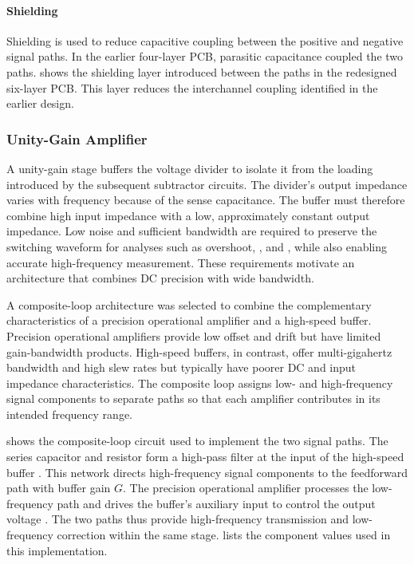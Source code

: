 \paragraph*{Shielding}
Shielding is used to reduce capacitive coupling between the positive and negative signal paths.
In the earlier four-layer PCB, parasitic capacitance  coupled the two paths.
 shows the shielding layer introduced between the paths in the redesigned six-layer PCB.
This layer reduces the interchannel coupling identified in the earlier design.











\FloatBarrier

\subsubsection*{Unity-Gain Amplifier}
A unity-gain stage buffers the voltage divider to isolate it from the loading introduced by the subsequent subtractor circuits.
The divider's output impedance varies with frequency because of the sense capacitance.
The buffer must therefore combine high input impedance with a low, approximately constant output impedance.
Low noise and sufficient bandwidth are required to preserve the switching waveform for analyses such as overshoot, , and , while also enabling accurate high-frequency measurement.
These requirements motivate an architecture that combines DC precision with wide bandwidth.

A composite-loop architecture was selected to combine the complementary characteristics of a precision operational amplifier and a high-speed buffer.
Precision operational amplifiers provide low offset and drift but have limited gain-bandwidth products.
High-speed buffers, in contrast, offer multi-gigahertz bandwidth and high slew rates but typically have poorer DC and input impedance characteristics.
The composite loop assigns low- and high-frequency signal components to separate paths so that each amplifier contributes in its intended frequency range.

 shows the composite-loop circuit used to implement the two signal paths.
The series capacitor  and resistor  form a high-pass filter at the input of the high-speed buffer .
This network directs high-frequency signal components to the feedforward path with buffer gain $G$.
The precision operational amplifier  processes the low-frequency path and drives the buffer's auxiliary input to control the output voltage .
The two paths thus provide high-frequency transmission and low-frequency correction within the same stage.
 lists the component values used in this implementation.


